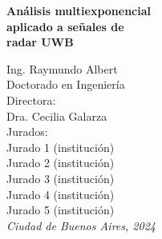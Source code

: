 
%
\begin{titlepage}
        \vspace*{2cm}
    
    	\RaggedLeft
    	
	   	{\textbf{ \selectfont\fontsize{33}{40}\selectfont Análisis multiexponencial \\ aplicado a señales de \\ radar UWB}} \vspace{1.5cm}
		
		{\selectfont \fontsize{20}{24}\selectfont Ing. Raymundo Albert}\\[2\baselineskip]
		
		{\selectfont \fontsize{15}{18}\selectfont Doctorado en Ingeniería} \\[2\baselineskip]
		
		{\selectfont \fontsize{11}{13.2} \selectfont Directora:\\[\baselineskip]
		Dra. Cecilia Galarza}\\[2\baselineskip]
		
		{\selectfont \fontsize{11}{13.2}\selectfont Jurados:\\[0.5\baselineskip]
		Jurado 1 (institución)\\[0.5\baselineskip]
		Jurado 2 (institución)\\[0.5\baselineskip]
		Jurado 3 (institución)\\[0.5\baselineskip]
		Jurado 4 (institución)\\[0.5\baselineskip]
		Jurado 5 (institución)}\\[2\baselineskip]
		\vfill
		{\selectfont \fontsize{10}{12}\selectfont\textit{Ciudad de Buenos Aires, 2024}}
	    \pagestyle{empty}
\end{titlepage}
%